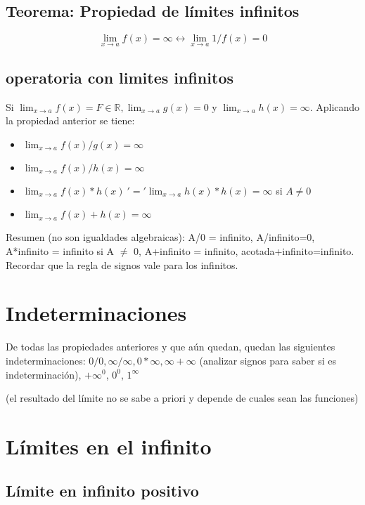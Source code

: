 \documentclass{report}
\begin{document}
		\subsection{Teorema: Propiedad de límites infinitos}
			
			$$\lim_{x \to a}f(x)=\infty \leftrightarrow \lim_{x \to a}1/f(x) = 0$$
		
		\subsection{operatoria con limites infinitos}
			Si $\lim_{x \to a}f(x)=F \in \mathbb{R}, \lim_{x \to a}g(x) = 0$ y $\lim_{x \to a}h(x)=\infty$. Aplicando la propiedad anterior se tiene:
			
			\begin{itemize}
				\item $\lim_{x \to a}f(x)/g(x) = \infty$
				\item $\lim_{x \to a}f(x)/h(x) = \infty$
				\item $\lim_{x \to a}f(x)*h(x) \ '=' \lim_{x \to a}h(x)*h(x) = \infty$ si $A \neq 0$
				\item $\lim_{x \to a}f(x)+h(x) = \infty$
			\end{itemize}
		
			Resumen (no son igualdades algebraicas): A/0 = infinito, A/infinito=0, A*infinito = infinito si A $\neq$ 0, A+infinito = infinito, acotada+infinito=infinito. Recordar que la regla de signos vale para los infinitos.
			
	\section{Indeterminaciones}
		De todas las propiedades anteriores y que aún quedan, quedan las siguientes indeterminaciones: $0/0, \infty/\infty, 0*\infty, \infty+\infty$ (analizar signos para saber si es indeterminación), $+\infty^0$, $0^0$, $1^\infty$
		
		(el resultado del límite no se sabe a priori y depende de cuales sean las funciones)
		
	\section{Límites en el infinito}
		\subsection{Límite en infinito positivo}
			
\end{document}

